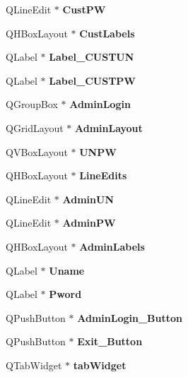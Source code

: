 \begin{DoxyCompactItemize}
Q\+Line\+Edit $\ast$ {\bfseries Cust\+PW}
\item 
\mbox{\label{class_ui___main_window_a0097277194d91c1433f2443298d78323}} 
Q\+H\+Box\+Layout $\ast$ {\bfseries Cust\+Labels}
\item 
\mbox{\label{class_ui___main_window_a7395db4facfd11d11d5577ae72af0442}} 
Q\+Label $\ast$ {\bfseries Label\+\_\+\+C\+U\+S\+T\+UN}
\item 
\mbox{\label{class_ui___main_window_a79af090142813243eccdfc53c7d7488f}} 
Q\+Label $\ast$ {\bfseries Label\+\_\+\+C\+U\+S\+T\+PW}
\item 
\mbox{\label{class_ui___main_window_a81c6accddea1e2236addba9562f46187}} 
Q\+Group\+Box $\ast$ {\bfseries Admin\+Login}
\item 
\mbox{\label{class_ui___main_window_a0ff4b1897f5dc094ca715d85b0cb55d4}} 
Q\+Grid\+Layout $\ast$ {\bfseries Admin\+Layout}
\item 
\mbox{\label{class_ui___main_window_a272e7c8cacfb2b98db4e0f2ab2186eb9}} 
Q\+V\+Box\+Layout $\ast$ {\bfseries U\+N\+PW}
\item 
\mbox{\label{class_ui___main_window_a3be3245576b96446064081c7f0a9309c}} 
Q\+H\+Box\+Layout $\ast$ {\bfseries Line\+Edits}
\item 
\mbox{\label{class_ui___main_window_a6df0a98fd9073f2608ebfadfa75aad8b}} 
Q\+Line\+Edit $\ast$ {\bfseries Admin\+UN}
\item 
\mbox{\label{class_ui___main_window_af1caeda58afbcb8092dfb23ab205d341}} 
Q\+Line\+Edit $\ast$ {\bfseries Admin\+PW}
\item 
\mbox{\label{class_ui___main_window_a3537432f157871fedbb878663bf5b91f}} 
Q\+H\+Box\+Layout $\ast$ {\bfseries Admin\+Labels}
\item 
\mbox{\label{class_ui___main_window_a6f41cda44d46e292fdef7450a4814a1d}} 
Q\+Label $\ast$ {\bfseries Uname}
\item 
\mbox{\label{class_ui___main_window_a2c2c612eeeb922794b7059161b4e19e9}} 
Q\+Label $\ast$ {\bfseries Pword}
\item 
\mbox{\label{class_ui___main_window_afd42764bebde2137d01bf85fc08b7df2}} 
Q\+Push\+Button $\ast$ {\bfseries Admin\+Login\+\_\+\+Button}
\item 
\mbox{\label{class_ui___main_window_ac35dd1bf4f69bfee7988766be33b7562}} 
Q\+Push\+Button $\ast$ {\bfseries Exit\+\_\+\+Button}
\item 
\mbox{\label{class_ui___main_window_a3260b943854b841c986f47c4726ee7f9}} 
Q\+Tab\+Widget $\ast$ {\bfseries tab\+Widget}
\item 

\end{DoxyCompactItemize}
